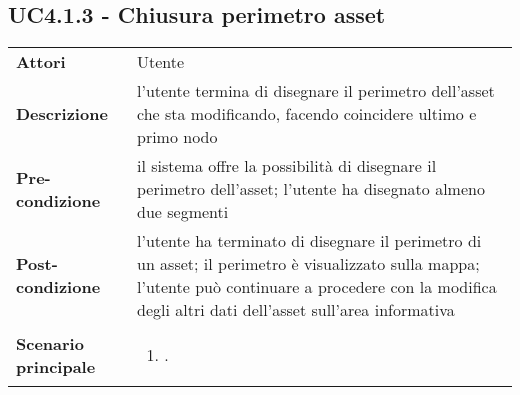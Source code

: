 \subsection{UC4.1.3 - Chiusura perimetro asset} 
\label{sssec:UC4.1.3} 
\def\arraystretch{1.5}
\begin{tabularx}{\textwidth}{l|p{}}
	\rowcolor{I} \multicolumn{2}{c}{\color{white}\textbf{UC4.1.3 - Chiusura perimetro asset}} \\
	\toprule
	\endhead
	\textbf{Attori} & Utente\\
	\textbf{Descrizione} & l'utente termina di disegnare il perimetro dell'asset che sta modificando, facendo coincidere ultimo e primo nodo\\
	\textbf{Pre-condizione} & il sistema offre la possibilità di disegnare il perimetro dell'asset; l'utente ha disegnato almeno due segmenti\\
	\textbf{Post-condizione} & l'utente ha terminato di disegnare il perimetro di un asset; il perimetro è visualizzato sulla mappa; l'utente può continuare a procedere con la modifica degli altri dati dell'asset sull'area informativa\\
	\textbf{Scenario principale} & \vspace{-1.2em}\begin{enumerate}[leftmargin=*,noitemsep,nosep]
		\item \nameref{sssec:UC4.1.3}.
	\end{enumerate}\\
	\bottomrule
\end{tabularx}
